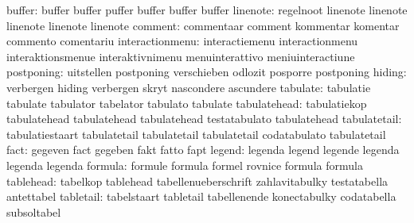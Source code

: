                    buffer: buffer                    buffer
                           puffer                    buffer
                           buffer                    buffer
                 linenote: regelnoot                 linenote
                           linenote                  linenote
                           linenote                  linenote
                  comment: commentaar                comment
                           kommentar                 komentar
                           commento                  comentariu
          interactionmenu: interactiemenu            interactionmenu
                           interaktionsmenue         interaktivnimenu
                           menuinterattivo           meniuinteractiune
               postponing: uitstellen                postponing
                           verschieben               odlozit
                           posporre                  postponing %
                   hiding: verbergen                 hiding
                           verbergen                 skryt
                           nascondere                ascundere
                 tabulate: tabulatie                 tabulate
                           tabulator                 tabelator
                           tabulato                  tabulate
             tabulatehead: tabulatiekop              tabulatehead
                           tabulatehead              tabulatehead
                           testatabulato             tabulatehead %
             tabulatetail: tabulatiestaart           tabulatetail
                           tabulatetail              tabulatetail
                           codatabulato              tabulatetail %
                     fact: gegeven                   fact
                           gegeben                   fakt
                           fatto                     fapt
                   legend: legenda                   legend
                           legende                   legenda
                           legenda                   legenda
                  formula: formule                   formula
                           formel                    rovnice
                           formula                   formula
                tablehead: tabelkop                  tablehead
                           tabellenueberschrift      zahlavitabulky
                           testatabella              antettabel
                tabletail: tabelstaart               tabletail
                           tabellenende              konectabulky
                           codatabella               subsoltabel
